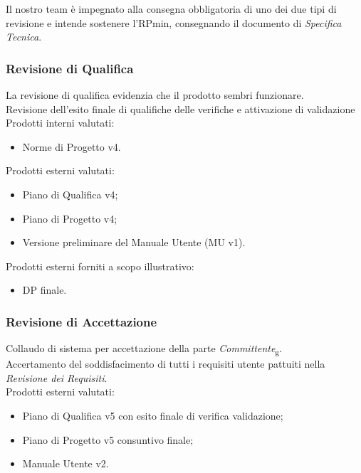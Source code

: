 \documentclass[12pt,a4paper,titlepage]{article}
\begin{document}
	Il nostro team è impegnato alla consegna obbligatoria di uno dei due tipi di revisione e intende sostenere l'RPmin, consegnando il documento di \textit{Specifica Tecnica}.
	
	\subsubsection{Revisione di Qualifica}
	La revisione di qualifica evidenzia che il prodotto sembri funzionare. \\
	Revisione dell'esito finale di qualifiche delle verifiche e attivazione di validazione \\
	Prodotti interni valutati:
	\begin{itemize}
		\item Norme di Progetto v4.
	\end{itemize}
	Prodotti esterni valutati:
	\begin{itemize}
		\item Piano di Qualifica v4;
		\item Piano di Progetto v4;
		\item Versione preliminare del Manuale Utente (MU v1).
	\end{itemize}
	Prodotti esterni forniti a scopo illustrativo:
	\begin{itemize}
		\item DP finale.
	\end{itemize}
	
	\subsubsection{Revisione di Accettazione}
	Collaudo di sistema per accettazione della parte \textit{Committente}\textsubscript{g}.\\
	Accertamento del soddisfacimento di tutti i requisiti utente pattuiti nella \textit{Revisione dei Requisiti}.\\
	Prodotti esterni valutati:
	\begin{itemize}
		\item Piano di Qualifica v5 con esito finale di verifica validazione;
		\item Piano di Progetto v5 consuntivo finale;
		\item Manuale Utente v2.
	\end{itemize}
	
	\newpage
	
\end{document}
